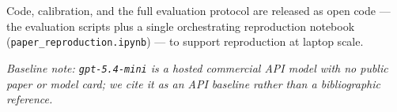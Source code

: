 \documentclass[sigconf,nonacm]{acmart}
\begin{document}
Code, calibration, and the full evaluation protocol are released as open code --- the evaluation scripts plus a single orchestrating reproduction notebook (\texttt{paper\_reproduction.ipynb}) --- to support reproduction at laptop scale.

\emph{Baseline note: \texttt{gpt-5.4-mini} is a hosted commercial API model with no public paper or model card; we cite it as an API baseline rather than a bibliographic reference.}



\end{document}
